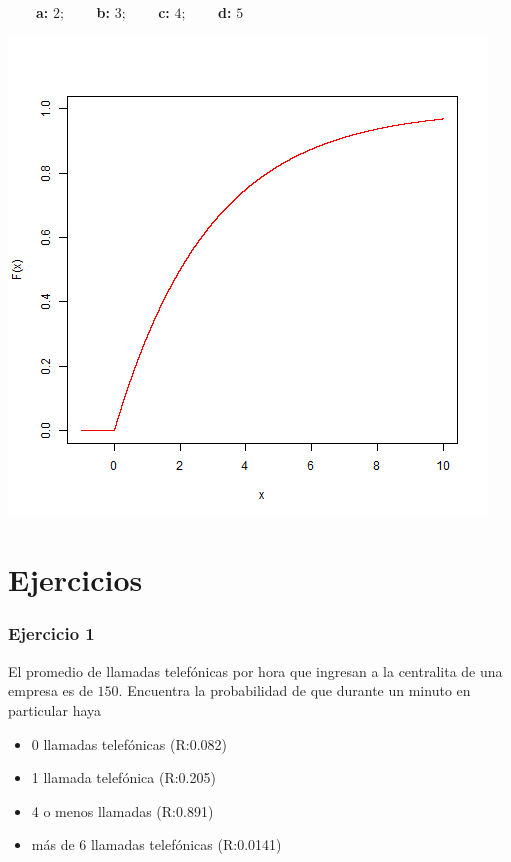 \documentclass[
]{book}
\providecommand{\tightlist}{%
  \setlength{\itemsep}{0pt}\setlength{\parskip}{0pt}}
\begin{document}
\textbf{\(\qquad\)a:} \(2\); \textbf{\(\qquad\)b:} \(3\); \textbf{\(\qquad\)c:} \(4\); \textbf{\(\qquad\)d:} \(5\)

\includegraphics{./figures/exp.png}

\hypertarget{ejercicios-6}{%
\section{Ejercicios}\label{ejercicios-6}}

\hypertarget{ejercicio-1-5}{%
\subsubsection{Ejercicio 1}\label{ejercicio-1-5}}

El promedio de llamadas telefónicas por hora que ingresan a la centralita de una empresa es de \(150\). Encuentra la probabilidad de que durante un minuto en particular haya

\begin{itemize}
\tightlist
\item
  0 llamadas telefónicas (R:0.082)
\item
  1 llamada telefónica (R:0.205)
\item
  4 o menos llamadas (R:0.891)
\item
  más de 6 llamadas telefónicas (R:0.0141)
\end{itemize}
\end{document}
